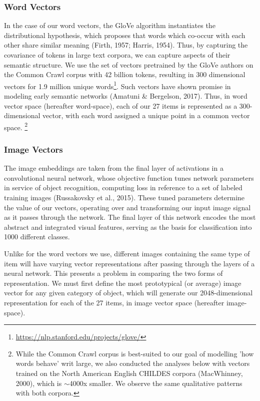 \documentclass[10pt, letterpaper]{article}
\begin{document}
\subsubsection{Word Vectors}\label{word-vectors}

In the case of our word vectors, the GloVe algorithm instantiates the
distributional hypothesis, which proposes that words which co-occur with
each other share similar meaning (Firth, 1957; Harris, 1954). Thus, by
capturing the covariance of tokens in large text corpora, we can capture
aspects of their semantic structure. We use the set of vectors
pretrained by the GloVe authors on the Common Crawl corpus with 42
billion tokens, resulting in 300 dimensional vectors for 1.9 million
unique words\footnote{\url{https://nlp.stanford.edu/projects/glove/}}.
Such vectors have shown promise in modeling early semantic networks
(Amatuni \& Bergelson, 2017). Thus, in word vector space (hereafter
word-space), each of our 27 items is represented as a 300-dimensional
vector, with each word assigned a unique point in a common vector space.
\footnote{While the Common Crawl corpus is best-suited to our goal of modelling 'how words behave' writ large, we also conducted the analyses below with vectors trained on the North American English CHILDES corpora (MacWhinney, 2000), which is $\sim$4000x smaller. We observe the same qualitative patterns with both corpora.}

\subsubsection{Image Vectors}\label{image-vectors}

The image embeddings are taken from the final layer of activations in a
convolutional neural network, whose objective function tunes network
parameters in service of object recognition, computing loss in reference
to a set of labeled training images (Russakovsky et al., 2015). These
tuned parameters determine the value of our vectors, operating over and
transforming our input image signal as it passes through the network.
The final layer of this network encodes the most abstract and integrated
visual features, serving as the basis for classification into 1000
different classes.

Unlike for the word vectors we use, different images containing the same
type of item will have varying vector representations after passing
through the layers of a neural network. This presents a problem in
comparing the two forms of representation. We must first define the most
prototypical (or average) image vector for any given category of object,
which will generate our 2048-dimensional representation for each of the
27 items, in image vector space (hereafter image-space).
\end{document}
